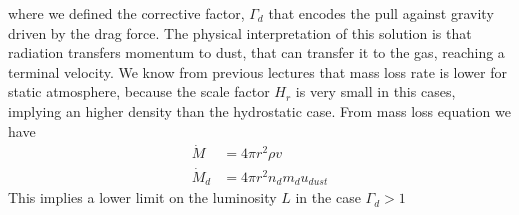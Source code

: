 \documentclass[main.tex]{subfiles}
\begin{document}
where we defined the corrective factor, $\Gamma_d$ that encodes the pull against gravity driven by the drag force. The physical interpretation of this solution is that radiation transfers momentum to dust, that can transfer it to the gas, reaching a terminal velocity.
We know from previous lectures that mass loss rate is lower for static atmosphere, because the scale factor $H_r$ is very small in this cases, implying an higher density than the hydrostatic case.
From mass loss equation we have
\begin{subequations}
\begin{align}
    \dot M&= 4\pi r^2 \rho v\\
    \dot M_d&=4\pi r^2 n_d m_d u_{dust}
\end{align}
\end{subequations}
This implies a lower limit on the luminosity $L$ in the case $\Gamma_d>1$
\end{document}
